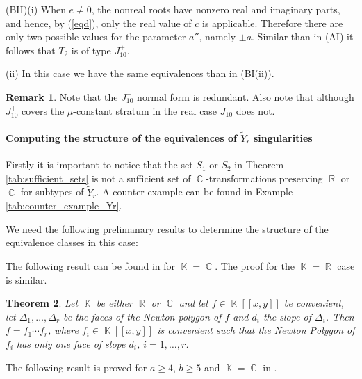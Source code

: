 \documentclass[noend]{amsproc}
\newtheorem{theorem}{Theorem}
\theoremstyle{definition}
\newtheorem{remark}[theorem]{Remark}
\DeclareMathOperator{\R}{\mathbb{R}}
\DeclareMathOperator{\C}{\mathbb{C}}
\DeclareMathOperator{\K}{\mathbb{K}}
\begin{document}
(BII)(i) When $e\neq 0$, the nonreal roots have nonzero real and imaginary parts, and hence, by (\ref{eqd}), only the real value of $c$ is applicable. Therefore there are only two possible values for the parameter $a''$, namely $\pm a$. Similar than in (AI) it follows that $T_2$ is of type $J_{10}^+$.

(ii)  In this case 
we have the same equivalences than in (BI(ii)).

\begin{remark}
Note that the $J_{10}^-$ normal form is redundant. Also note that although $J_{10}^+$ covers the $\mu$-constant stratum in the real case $J_{10}^-$ does not.
\end{remark}
\paragraph{\bf Computing the structure of the equivalences of $\widetilde Y_r$ singularities} Firstly it is important to notice that the set $S_1$ or $S_2$ in Theorem \ref{tab:sufficient_sets} is not a sufficient set of $\C$-transformations preserving $\R$ or $\C$ for subtypes of $\widetilde Y_r$. A counter example can be found in Example \ref{tab:counter_example_Yr}.

We need the following prelimanary results to determine the structure of the equivalence classes in this case:

The following result can be found in \cite{PdJ2000} for $\K=\C$. The proof for the $\K=\R$ case is similar.

\begin{theorem}\label{faces}
Let $\K$ be either $\R$ or $\C$ and let $f\in\K[[x,y]]$ be convenient, let $\Delta_1,\ldots,\Delta_r$ be the faces of the Newton polygon of $f$ and $d_i$ the slope of $\Delta_i$. Then $f=f_1\cdots f_r$, where $f_i\in\K[[x,y]]$ is convenient such that the Newton Polygon of $f_i$ has only one face of slope $d_i$, $i=1,\ldots,r$.
\end{theorem}
 
The following result is proved for $a\ge 4$, $b\ge 5$ and $\K=\C$ in \cite{A1975}.
\end{document}
